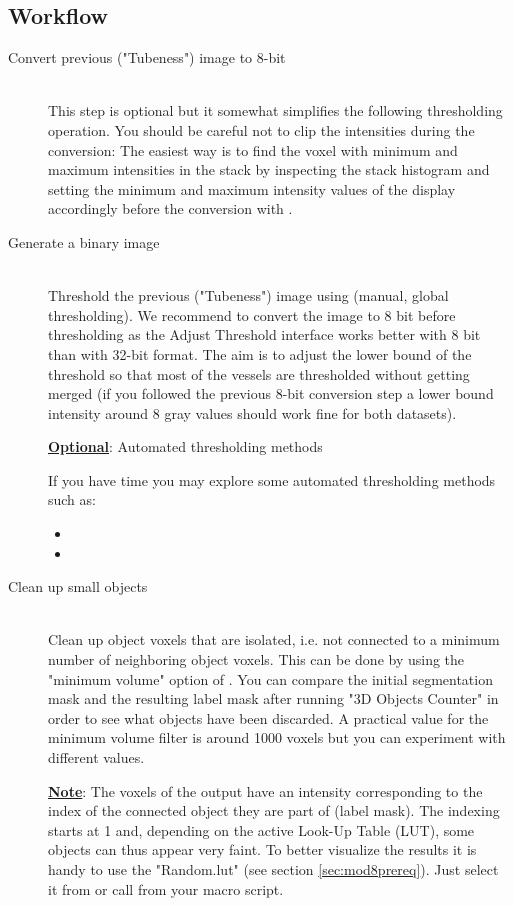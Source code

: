 \subsection{Workflow}
%
\begin{description}
%
\item[Convert previous ("Tubeness") image to 8-bit]\hfill\\
This step is optional but it somewhat simplifies the following thresholding operation. You should be careful not to clip the intensities during the conversion: The easiest way is to find the voxel with minimum and maximum intensities in the stack by inspecting the stack histogram and setting the minimum and maximum intensity values of the display accordingly before the conversion with  . 
%
\item[Generate a binary image]\hfill\\
%
Threshold the previous ("Tubeness") image using  (manual, global thresholding). We recommend to convert the image to 8 bit before thresholding as the Adjust Threshold interface works better with 8 bit than with 32-bit format. The aim is to adjust the lower bound of the threshold so that most of the vessels are thresholded without getting merged (if you followed the previous 8-bit conversion step a lower bound intensity around 8 gray values should work fine for both datasets).
%

\textbf{\underline{Optional}}: Automated thresholding methods

If you have time you may explore some automated thresholding methods such as:
\begin{itemize}
\item {}
\item {}
\end{itemize}

\item[Clean up small objects] \hfill\\
Clean up object voxels that are isolated, i.e. not connected to a minimum number of neighboring object voxels. This can be done by using the "minimum volume" option of . You can compare the initial segmentation mask and the resulting label mask after running "3D Objects Counter" in order to see what objects have been discarded. A practical value for the minimum volume filter is around 1000 voxels but you can experiment with different values.
%

\textbf{\underline{Note}}: The voxels of the output have an intensity corresponding to the index of the connected object they are part of (label mask). The indexing starts at 1 and, depending on the active Look-Up Table (LUT), some objects can thus appear very faint. To better visualize the results it is handy to use the "Random.lut" (see section \ref{sec:mod8prereq}). Just select it from  or call  from your macro script.

\end{description}

